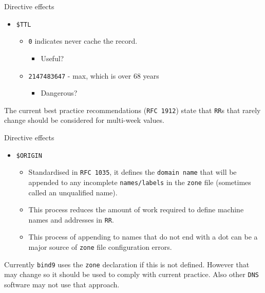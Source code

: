 \documentclass[xcolor=table]{beamer}
\begin{document}
\begin{frame}{Directive effects}
  \begin{itemize}
    \item \texttt{\$TTL}
      \begin{itemize}
        \item \texttt{0} indicates never cache the record.
          \begin{itemize}
            \item Useful?
          \end{itemize}
        \item \texttt{2147483647} - max, which is over 68 years
          \begin{itemize}
            \item Dangerous?
          \end{itemize}
      \end{itemize}
  \end{itemize}
  \begin{tcolorbox}[title={\textbf{NOTE:}}]
    The current best practice recommendations (\texttt{RFC 1912}) state that \texttt{RR}s that rarely change should be considered for multi-week values.
  \end{tcolorbox}
\end{frame}

\begin{frame}{Directive effects}
  \begin{itemize}
    \item \texttt{\$ORIGIN}
      \begin{itemize}
        \item Standardised in \texttt{RFC 1035}, it defines the \texttt{domain name} that will be appended to any incomplete \texttt{names/labels} in the \texttt{zone} file (sometimes called an unqualified name).
        \item This process reduces the amount of work required to define machine names and addresses in \texttt{RR}.
        \item This process of appending to names that do not end with a dot can be a major source of \texttt{zone} file configuration errors.
      \end{itemize}
  \end{itemize}
  \begin{tcolorbox}[title={\textbf{NOTE:}}]
    Currently \texttt{bind9} uses the \texttt{zone} declaration if this is not defined. However that may change so it should be used to comply with current practice. Also other \texttt{DNS} software may not use that approach.
  \end{tcolorbox}
\end{frame}
\end{document}
